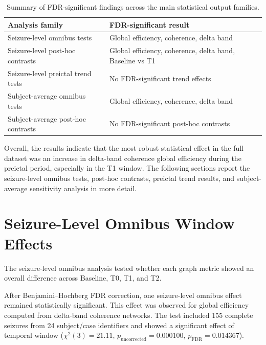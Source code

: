 \begin{table}[H]
    \centering
    \begin{tabular}{p{}p{}}
        \toprule
        Analysis family & FDR-significant result \\
        \midrule
        Seizure-level omnibus tests
        & Global efficiency, coherence, delta band \\

        Seizure-level post-hoc contrasts
        & Global efficiency, coherence, delta band, Baseline vs T1 \\

        Seizure-level preictal trend tests
        & No FDR-significant trend effects \\

        Subject-average omnibus tests
        & Global efficiency, coherence, delta band \\

        Subject-average post-hoc contrasts
        & No FDR-significant post-hoc contrasts \\
        \bottomrule
    \end{tabular}
    \caption{Summary of FDR-significant findings across the main statistical
    output families.}
    \label{tab:results-significant-output-summary}
\end{table}

Overall, the results indicate that the most robust statistical effect in the
full dataset was an increase in delta-band coherence global efficiency during
the preictal period, especially in the T1 window. The following sections report
the seizure-level omnibus tests, post-hoc contrasts, preictal trend results,
and subject-average sensitivity analysis in more detail.

\section{Seizure-Level Omnibus Window Effects}
\label{sec:results-seizure-level-omnibus}

The seizure-level omnibus analysis tested whether each graph metric showed an
overall difference across Baseline, T0, T1, and T2. 

After Benjamini--Hochberg FDR correction, one seizure-level omnibus effect
remained statistically significant. This effect was observed for global
efficiency computed from delta-band coherence networks. The test included
\num{155} complete seizures from \num{24} subject/case identifiers and showed a
significant effect of temporal window
($\chi^2(3) = 21.11$, $p_{\mathrm{uncorrected}} = 0.000100$,
$p_{\mathrm{FDR}} = 0.014367$).

